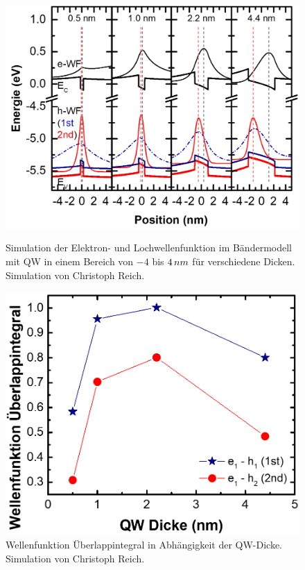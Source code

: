 \begin{figure}[H]
  \centering
  \begin{minipage}[t]{0.49\textwidth}
    \centering
    \includegraphics[width=\textwidth]{Bilder/MQWdickenSerie/Simu1.png}
		\caption{Simulation der Elektron- und Lochwellenfunktion im Bändermodell mit QW in einem Bereich von $-4$ bis $4 \thinspace nm$ für verschiedene Dicken. Simulation von Christoph Reich.}
    \label{fig:undotiertSpektrum}
  \end{minipage}
	\hfill
  \begin{minipage}[t]{0.49\textwidth}
    \centering
    \includegraphics[width=\linewidth]{Bilder/MQWdickenSerie/Simu2.png}
		\caption{Wellenfunktion Überlappintegral in Abhängigkeit der QW-Dicke. Simulation von Christoph Reich.}
    \label{fig:dotiertSpektrum}
  \end{minipage}
\end{figure}
